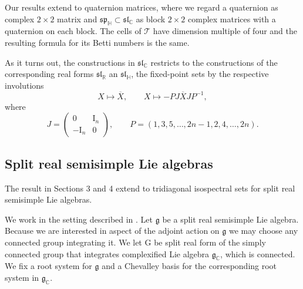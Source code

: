 \documentclass[reqno]{amsart}
\renewcommand{\gg}{\mathfrak{g}}
\renewcommand{\sl}{\mathfrak{sl}}
\renewcommand{\sp}{\mathfrak{sp}}
\newcommand{\cT}{\mathcal{T}}
\newcommand{\R}{\mathbb{R}}
\newcommand{\C}{\mathbb{C}}
\newcommand{\G}{\mathrm{G}}
\begin{document}
 Our results extend to quaternion matrices, where we regard a quaternion as complex $2\times 2$ matrix
 and $\sp_\mathbb{H}\subset \sl_\C$ as block $2\times 2$ complex matrices with a quaternion on each block.
 The cells of $\cT$ have dimension multiple of four and the resulting formula for its Betti numbers is the same.

 As it turns out, the constructions in $\sl_\C$ restricts to the constructions of the corresponding real forms $\sl_\R$ an $\sl_\mathbb{H}$, the fixed-point sets by the respective involutions
 \[X\mapsto \overline{X},\qquad X\mapsto -PJ\overline{X}JP^{-1},\]
 where \[J=\begin{pmatrix} 0& \mathrm{I}_n\\-\mathrm{I}_n & 0\end{pmatrix},\qquad P=(1,3,5,\dots,2n-1,2,4,\dots,2n).\]


\subsection{Split real semisimple Lie algebras}
The result in Sections 3 and 4 extend to tridiagonal isospectral sets for split real semisimple Lie algebras.

We work in the setting described in \cite[Sections 10-13]{Da2}. Let $\gg$ be a split real semisimple Lie algebra. Because we are interested in aspect of the adjoint action on $\gg$ we may choose any connected group integrating it. We let $\G$ be split real form of the simply connected group that integrates complexified Lie algebra $\gg_\C$, which is connected. We fix a root system for $\gg$ and a Chevalley basis for the corresponding root system in $\gg_\C$.
\end{document}
